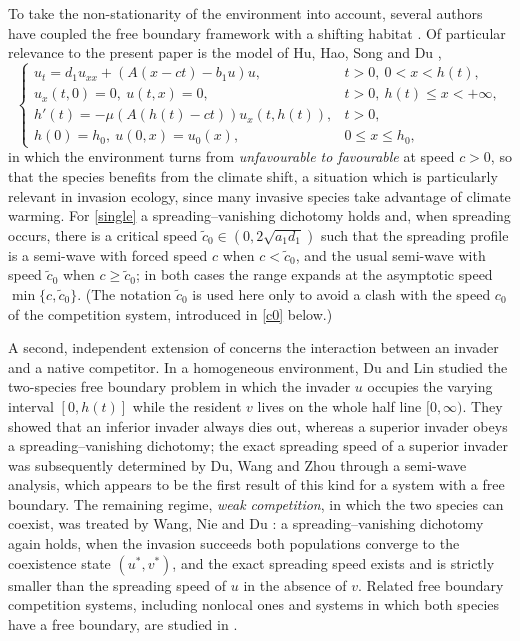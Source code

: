 \documentclass[reqno]{amsart}
\theoremstyle{plain}
\theoremstyle{definition}
\theoremstyle{remark}
\begin{document}
To take the non-stationarity of the environment into account, several authors
have coupled the free boundary framework with a shifting habitat
\cite{MR3764580,MR3871607,MR3639148,MR4766631}. Of particular relevance to the
present paper is the model of Hu, Hao, Song and Du \cite{HU20205931},
\begin{equation}\label{single}
	\begin{cases}
		u_t = d_1 u_{xx} + (A(x - ct) - b_1 u) u, & t > 0,~ 0 < x < h(t), \\
		u_x(t, 0) = 0, ~ u(t, x) = 0, & t > 0, ~ h(t) \leq x < +\infty, \\
		h'(t) = -\mu (A(h(t) - ct))u_x(t, h(t)), & t > 0, \\
		h(0)=h_0,~ u(0, x) = u_0(x), & 0 \leq x \leq h_0,
	\end{cases}
\end{equation}
in which the environment turns from \emph{unfavourable to favourable} at speed
$c>0$, so that the species benefits from the climate shift, a situation which
is particularly relevant in invasion ecology, since many invasive species take
advantage of climate warming. For \eqref{single} a spreading--vanishing dichotomy
holds and, when spreading occurs, there is a critical speed
$\tilde c_0\in(0,2\sqrt{a_1d_1})$ such that the spreading profile is a semi-wave
with forced speed $c$ when $c<\tilde c_0$, and the usual semi-wave with speed
$\tilde c_0$ when $c\ge \tilde c_0$; in both cases the range expands at the
asymptotic speed $\min\{c,\tilde c_0\}$. (The notation $\tilde c_0$ is used here
only to avoid a clash with the speed $c_0$ of the competition system, introduced
in \eqref{c0} below.)

A second, independent extension of \cite{MR2607347} concerns the interaction
between an invader and a native competitor. In a homogeneous environment, Du and
Lin \cite{MR3327894} studied the two-species free boundary problem in which the
invader $u$ occupies the varying interval $[0,h(t)]$ while the resident $v$ lives
on the whole half line $[0,\infty)$. They showed that an inferior invader always
dies out, whereas a superior invader obeys a spreading--vanishing dichotomy; the
exact spreading speed of a superior invader was subsequently determined by Du,
Wang and Zhou \cite{MR3609207} through a semi-wave analysis, which appears to be
the first result of this kind for a system with a free boundary. The remaining
regime, \emph{weak competition}, in which the two species can coexist, was
treated by Wang, Nie and Du \cite{MR3986328}: a spreading--vanishing dichotomy
again holds, when the invasion succeeds both populations converge to the
coexistence state $(u^*,v^*)$, and the exact spreading speed exists and is
strictly smaller than the spreading speed of $u$ in the absence of $v$. Related
free boundary competition systems, including nonlocal ones and systems in which
both species have a free boundary, are studied in
\cite{Lei2018,MR4873231}.
\end{document}
